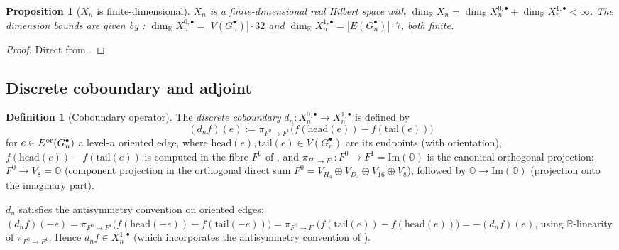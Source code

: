 \documentclass[11pt, a4paper]{amsart}
\newtheorem{proposition}[theorem]{Proposition}
\theoremstyle{definition}
\newtheorem{definition}[theorem]{Definition}
\newcommand{\R}{\mathbb{R}}
\newcommand{\OO}{\mathbb{O}}
\renewcommand{\Im}{\mathrm{Im}}
\begin{document}
\begin{proposition}[$X_n$ is finite-dimensional]
\label{prop:Xn-finite}
$X_n$ is a finite-dimensional real Hilbert space with
$\dim_\R X_n = \dim_\R X_n^{0, \bullet} + \dim_\R X_n^{1, \bullet}
< \infty$. The dimension bounds are given by
\cite[Proposition~\texttt{prop:Xn-Hilbert}]{RefinementSpaces}:
$\dim_\R X_n^{0, \bullet} = |V(G_n^\bullet)| \cdot 32$ and
$\dim_\R X_n^{1, \bullet} = |E(G_n^\bullet)| \cdot 7$, both
finite.
\end{proposition}

\begin{proof}
Direct from \cite[Proposition~\texttt{prop:Xn-Hilbert}]{RefinementSpaces}.
\end{proof}

\subsection{Discrete coboundary and adjoint}

\begin{definition}[Coboundary operator]
\label{def:coboundary}
The \emph{discrete coboundary}
$d_n \colon X_n^{0, \bullet} \to X_n^{1, \bullet}$ is defined by
\[
  (d_n f)(e) := \pi_{F^0 \to F^1}\bigl(
    f(\text{head}(e)) - f(\text{tail}(e))\bigr)
\]
for $e \in E^{\rm or}(G_n^\bullet)$ a level-$n$ oriented edge,
where $\text{head}(e), \text{tail}(e) \in V(G_n^\bullet)$ are its
endpoints (with orientation), $f(\text{head}(e)) -
f(\text{tail}(e))$ is computed in the fibre $F^0$ of
\cite[Notation~\texttt{not:fibres}]{RefinementSpaces}, and
$\pi_{F^0 \to F^1} \colon F^0 \to F^1 = \Im(\OO)$ is the
canonical orthogonal projection: $F^0 \to V_8 = \OO$ (component
projection in the orthogonal direct sum
$F^0 = V_{H_4} \oplus V_{D_4} \oplus V_{16} \oplus V_8$),
followed by $\OO \to \Im(\OO)$ (projection onto the imaginary
part).

$d_n$ satisfies the antisymmetry convention on oriented edges:
$(d_n f)(-e) = \pi_{F^0 \to F^1}\bigl(
f(\text{head}(-e)) - f(\text{tail}(-e))\bigr) =
\pi_{F^0 \to F^1}\bigl(f(\text{tail}(e)) - f(\text{head}(e))
\bigr) = -(d_n f)(e)$, using $\R$-linearity of $\pi_{F^0 \to F^1}$.
Hence $d_n f \in X_n^{1, \bullet}$ (which incorporates the
antisymmetry convention of
\cite[Definition~\texttt{def:Xn-1}]{RefinementSpaces}).
\end{definition}
\end{document}
